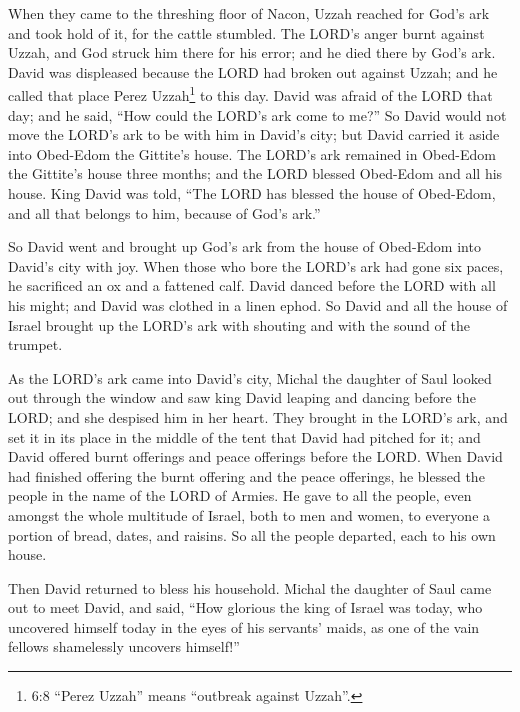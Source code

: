  When they came to the threshing floor of Nacon, Uzzah
reached for God's ark and took hold of it, for the cattle stumbled.
 The LORD's anger burnt against Uzzah, and God struck him
there for his error; and he died there by God's ark.  David
was displeased because the LORD had broken out against Uzzah; and he
called that place Perez Uzzah\footnote{6:8 ``Perez Uzzah'' means
  ``outbreak against Uzzah''.} to this day.  David was
afraid of the LORD that day; and he said, ``How could the LORD's ark
come to me?''  So David would not move the LORD's ark to be
with him in David's city; but David carried it aside into Obed-Edom the
Gittite's house.  The LORD's ark remained in Obed-Edom the
Gittite's house three months; and the LORD blessed Obed-Edom and all his
house.  King David was told, ``The LORD has blessed the
house of Obed-Edom, and all that belongs to him, because of God's ark.''

So David went and brought up God's ark from the house of Obed-Edom into
David's city with joy.  When those who bore the LORD's ark
had gone six paces, he sacrificed an ox and a fattened calf.
 David danced before the LORD with all his might; and David
was clothed in a linen ephod.  So David and all the house
of Israel brought up the LORD's ark with shouting and with the sound of
the trumpet.

 As the LORD's ark came into David's city, Michal the
daughter of Saul looked out through the window and saw king David
leaping and dancing before the LORD; and she despised him in her heart.
 They brought in the LORD's ark, and set it in its place in
the middle of the tent that David had pitched for it; and David offered
burnt offerings and peace offerings before the LORD.  When
David had finished offering the burnt offering and the peace offerings,
he blessed the people in the name of the LORD of Armies. 
He gave to all the people, even amongst the whole multitude of Israel,
both to men and women, to everyone a portion of bread, dates, and
raisins. So all the people departed, each to his own house.

 Then David returned to bless his household. Michal the
daughter of Saul came out to meet David, and said, ``How glorious the
king of Israel was today, who uncovered himself today in the eyes of his
servants' maids, as one of the vain fellows shamelessly uncovers
himself!''

